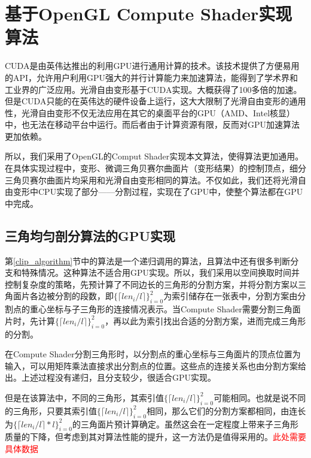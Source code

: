 
\chapter{基于OpenGL Compute Shader实现算法}
CUDA是由英伟达推出的利用GPU进行通用计算的技术。该技术提供了方便易用的API，允许用户利用GPU强大的并行计算能力来加速算法，能得到了学术界和工业界的广泛应用。光滑自由变形\cite{Cui15}基于CUDA实现。大概获得了100多倍的加速。但是CUDA只能的在英伟达的硬件设备上运行，这大大限制了光滑自由变形的通用性，光滑自由变形不仅无法应用在其它的桌面平台的GPU（AMD、Intel核显）中，也无法在移动平台中运行。而后者由于计算资源有限，反而对GPU加速算法更加依赖。

所以，我们采用了OpenGL的Comput Shader实现本文算法，使得算法更加通用。在具体实现过程中，变形、微调三角贝赛尔曲面片（变形结果）的控制顶点，细分三角贝赛尔曲面片均采用和光滑自由变形相同的算法。不仅如此，我们还将光滑自由变形中CPU实现了部分——分割过程，实现在了GPU中，使整个算法都在GPU中完成。

\section{三角均匀剖分算法的GPU实现}
第\autoref{clip_algorithm}节中的算法是一个递归调用的算法，且算法中还有很多判断分支和特殊情况。这种算法不适合用GPU实现。所以，我们采用以空间换取时间并控制复杂度的策略，先预计算了不同边长的三角形的分割方案，并将分割方案以三角面片各边被分割的段数，即$\{\lceil len_i/l \rceil\}^{2}_{i=0}$为索引储存在一张表中，分割方案由分割点的重心坐标与子三角形的连接情况表示。当Compute Shader需要分割三角面片时，先计算$\{\lceil len_i/l \rceil\}^{2}_{i=0}$，再以此为索引找出合适的分割方案，进而完成三角形的分割。

在Compute Shader分割三角形时，以分割点的重心坐标与三角面片的顶点位置为输入，可以用矩阵乘法直接求出分割点的位置。这些点的连接关系也由分割方案给出。上述过程没有递归，且分支较少，很适合GPU实现。

但是在该算法中，不同的三角形，其索引值$\{\lceil len_i/l \rceil\}^{2}_{i=0}$可能相同。也就是说不同的三角形，只要其索引值$\{\lceil len_i/l \rceil\}^{2}_{i=0}$相同，那么它们的分割方案都相同，由连长为$\{\lceil len_i/l \rceil * l\}^{2}_{i=0}$的三角面片预计算确定。虽然这会在一定程度上带来子三角形质量的下降，但考虑到其对算法性能的提升，这一方法仍是值得采用的。\textcolor{red}{此处需要具体数据}



